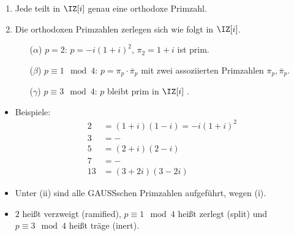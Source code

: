 \begin{Fakt}
 \begin{enumerate}
  \item Jede  teilt in $\IZ[i]$ genau eine orthodoxe Primzahl.
  \item Die orthodoxen Primzahlen zerlegen sich wie folgt in $\IZ[i]$.
  \begin{enumerate}
   \item[($\alpha$)] $p=2$: $p=-i(1+i)^2$, $\pi_2=1+i$ ist prim.
   \item[($\beta$)] $p\equiv 1\mod{4}$: $p=\pi_p \cdot \overline{\pi}_p$ mit zwei assoziierten Primzahlen $\pi_p, \overline{\pi}_p$.
   \item[($\gamma$)] $p\equiv 3\mod{4}$: $p$ bleibt prim in $\IZ[i]$ .
  \end{enumerate}
 \end{enumerate}
\end{Fakt}

\begin{Bemerkung}
\begin{itemize}
 \item Beispiele:
 \begin{align*}
	  2&=(1+i)(1-i)=-i(1+i)^2\\
	  3&= - \\
	  5&=(2+i)(2-i)\\
	  7&= -\\
	  13&=(3+2i)(3-2i)
       \end{align*}
\item Unter (ii) sind alle GAUSSschen Primzahlen aufgeführt, wegen (i).
\item $2$ heißt verzweigt (ramified), $p\equiv 1 \mod{4}$ heißt zerlegt (split) und $p\equiv 3\mod{4}$ heißt träge (inert).
\end{itemize}
\end{Bemerkung}

